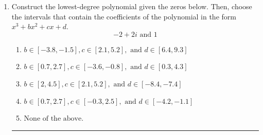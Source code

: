 \documentclass[14pt]{extbook}
\newcommand{\litem}[1]{\item#1\hspace*{-1cm}\rule{\textwidth}{0.4pt}}
\begin{document}
\begin{enumerate}
{\begin{enumerate}[label=\Alph*.]
\end{enumerate} }
\litem{
Construct the lowest-degree polynomial given the zeros below. Then, choose the intervals that contain the coefficients of the polynomial in the form $x^3+bx^2+cx+d$.\[ -2 + 2 i \text{ and } 1 \]\begin{enumerate}[label=\Alph*.]
\item \( b \in [-3.8, -1.5], c \in [2.1, 5.2], \text{ and } d \in [6.4, 9.3] \)
\item \( b \in [0.7, 2.7], c \in [-3.6, -0.8], \text{ and } d \in [0.3, 4.3] \)
\item \( b \in [2, 4.5], c \in [2.1, 5.2], \text{ and } d \in [-8.4, -7.4] \)
\item \( b \in [0.7, 2.7], c \in [-0.3, 2.5], \text{ and } d \in [-4.2, -1.1] \)
\item \( \text{None of the above.} \)


\end{enumerate}}
\end{enumerate}
\end{document}
